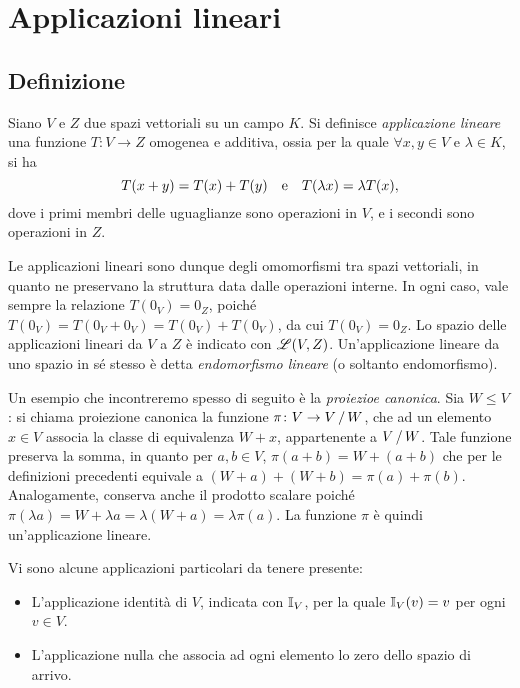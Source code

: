 \chapter{Applicazioni lineari}
\section{Definizione}
\begin{definizione} \label{d:applicazione-lineare}
	Siano $V$ e $Z$ due spazi vettoriali su un campo $K$.
	Si definisce \emph{applicazione lineare} una funzione $T\colon V\to Z$ omogenea e additiva, ossia per la quale $\forall  x,  y\in V$ e $\lambda\in K$, si ha
	\begin{equation*}
		T(x+y)=T(x)+T(y)\quad\text{e}\quad T(\lambda x)=\lambda T(x),
	\end{equation*}
	dove i primi membri delle uguaglianze sono operazioni in $V$, e i secondi sono operazioni in $Z$.
\end{definizione}
Le applicazioni lineari sono dunque degli omomorfismi tra spazi vettoriali, in quanto ne preservano la struttura data dalle operazioni interne.
In ogni caso, vale sempre la relazione $T(0_V)=0_Z$, poiché $T(0_V)=T(0_V+0_V)=T(0_V)+T(0_V)$, da cui $T(0_V)=0_Z$.
Lo spazio delle applicazioni lineari da $V$ a $Z$ è indicato con $\mathscr L(V,Z)$.
Un'applicazione lineare da uno spazio in s\'e stesso è detta \emph{endomorfismo lineare} (o soltanto endomorfismo).

Un esempio che incontreremo spesso di seguito è la \emph{proiezioe canonica}.
Sia $W\leq V$: si chiama proiezione canonica la funzione $\pi\colon V\to V\,/\, W$, che ad un elemento $  x\in V$ associa la classe di equivalenza $W+  x$, appartenente a $V\,/\, W$.
Tale funzione preserva la somma, in quanto per $  a,  b\in V$, $\pi(  a+  b)=W+(  a+  b)$ che per le definizioni precedenti equivale a $(W+  a)+(W+  b)=\pi(  a)+\pi(  b)$.
Analogamente, conserva anche il prodotto scalare poiché $\pi(\lambda  a)=W+\lambda  a=\lambda(W+  a)=\lambda\pi(  a)$.
La funzione $\pi$ è quindi un'applicazione lineare.

Vi sono alcune applicazioni particolari da tenere presente:
\begin{itemize}
	\item L'applicazione identità di $V$, indicata con $\mathbb I_V$, per la quale $\mathbb I_V(v)=v$ per ogni $v\in V$.
	\item L'applicazione nulla che associa ad ogni elemento lo zero dello spazio di arrivo.
\end{itemize}

